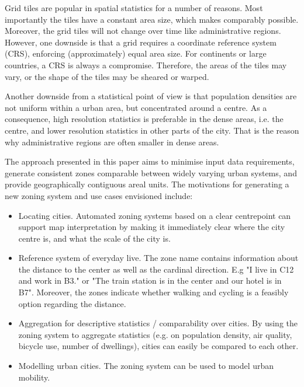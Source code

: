 \documentclass{josis}
\newcommand{\M}[1]{{\color{blue}\textbf{Martijn: #1}}}
\begin{document}
Grid tiles are popular in spatial statistics for a number of reasons. Most importantly the tiles have a constant area size, which makes comparably possible. Moreover, the grid tiles will not change over time like administrative regions. However, one downside is that a grid requires a coordinate reference system (CRS), enforcing (approximately) equal area size. For continents or large countries, a CRS is always a compromise. Therefore, the areas of the tiles may vary, or the shape of the tiles may be sheared or warped.

Another downside from a statistical point of view is that population densities are not uniform within a urban area, but concentrated around a centre. As a consequence, high resolution statistics is preferable in the dense areas, i.e. the centre, and lower resolution statistics in other parts of the city. That is the reason why administrative regions are often smaller in dense areas.

The approach presented in this paper aims to minimise input data requirements, generate consistent zones comparable between widely varying urban systems, and provide geographically contiguous areal units.
The motivations for generating a new zoning system and use cases envisioned include:

\begin{itemize}
    \item Locating cities. Automated zoning systems based on a clear centrepoint can support map interpretation by making it immediately clear where the city centre is, and what the scale of the city is. 
    \item Reference system of everyday live. The zone name contains information about the distance to the center as well as the cardinal direction. E.g "I live in C12 and work in B3." or "The train station is in the center and our hotel is in B7". Moreover, the zones indicate whether walking and cycling is a feasibly option regarding the distance.
    \item Aggregation for descriptive statistics / comparability over cities. By using the zoning system to aggregate statistics (e.g. on population density, air quality, bicycle use, number of dwellings), cities can easily be compared to each other.
    \item Modelling urban cities. The zoning system can be used to model urban mobility.
\end{itemize}
\end{document}
